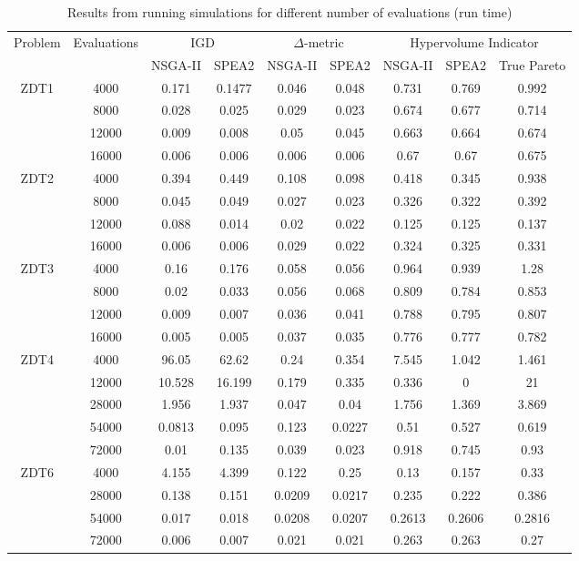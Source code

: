 \documentclass[sigconf,nonacm]{acmart}
\begin{document}
\begin{table}
    \centering
    \begin{tabular}{|c|c|c|c|c|c|c|c|c|}
    \hline
         \multirow{2}{3em}{Problem} & \multirow{2}{4.5em}{Evaluations} & \multicolumn{2}{|c|}{IGD} & \multicolumn{2}{|c|}{$\Delta$-metric} & \multicolumn{3}{|c|}{Hypervolume Indicator} \\
         & & NSGA-II & SPEA2 & NSGA-II & SPEA2 & NSGA-II & SPEA2 & True Pareto \\
         \hline
         \multirow{4}{3em}{ZDT1} & 4000 & 0.171 & 0.1477 & 0.046 & 0.048 & 0.731 & 0.769 & 0.992 \\
         & 8000 & 0.028 & 0.025 & 0.029 & 0.023 & 0.674 & 0.677 & 0.714 \\
         & 12000 & 0.009 & 0.008 & 0.05 & 0.045 & 0.663 & 0.664 & 0.674 \\
         & 16000 & 0.006 & 0.006 & 0.006 & 0.006 & 0.67 & 0.67 & 0.675 \\
         \hline
         \multirow{4}{3em}{ZDT2} & 4000 & 0.394 & 0.449 & 0.108 & 0.098 & 0.418 & 0.345 & 0.938 \\
         & 8000 & 0.045 & 0.049 & 0.027 & 0.023 & 0.326 & 0.322 & 0.392 \\
         & 12000 & 0.088 & 0.014 & 0.02 & 0.022 & 0.125 & 0.125 & 0.137 \\
         & 16000 & 0.006 & 0.006 & 0.029 & 0.022 & 0.324 & 0.325 & 0.331 \\
         \hline
         \multirow{4}{3em}{ZDT3} & 4000 & 0.16 & 0.176 & 0.058 & 0.056 & 0.964 & 0.939 & 1.28 \\
         & 8000 & 0.02 & 0.033 & 0.056 & 0.068 & 0.809 & 0.784 & 0.853 \\
         & 12000 & 0.009 & 0.007 & 0.036 & 0.041 & 0.788 & 0.795 & 0.807 \\
         & 16000 & 0.005 & 0.005 & 0.037 & 0.035 & 0.776 & 0.777 & 0.782 \\
         \hline
         \multirow{5}{3em}{ZDT4} & 4000 & 96.05 & 62.62 & 0.24 & 0.354 & 7.545 & 1.042 & 1.461 \\
         & 12000 & 10.528 & 16.199 & 0.179 & 0.335 & 0.336 & 0 & 21 \\
         & 28000 & 1.956 & 1.937 & 0.047 & 0.04 & 1.756 & 1.369 & 3.869 \\
         & 54000 & 0.0813 & 0.095 & 0.123 & 0.0227 & 0.51 & 0.527 & 0.619 \\
         & 72000 & 0.01 & 0.135 & 0.039 & 0.023 & 0.918 & 0.745 & 0.93 \\
         \hline
         \multirow{4}{3em}{ZDT6} & 4000 & 4.155 & 4.399 & 0.122 & 0.25 & 0.13 & 0.157 & 0.33 \\
         & 28000 & 0.138 & 0.151 & 0.0209 & 0.0217 & 0.235 & 0.222 & 0.386 \\
         & 54000 & 0.017 & 0.018 & 0.0208 & 0.0207 & 0.2613 & 0.2606 & 0.2816 \\
         & 72000 & 0.006 & 0.007 & 0.021 & 0.021 & 0.263 & 0.263 & 0.27 \\
         \hline
    \end{tabular}
    \caption{Results from running simulations for different number of evaluations (run time)}
\end{table}
\end{document}
